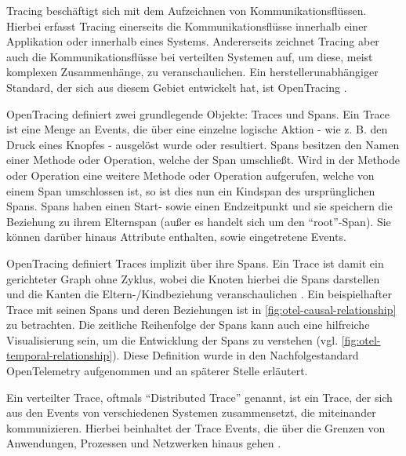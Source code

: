 Tracing beschäftigt sich mit dem Aufzeichnen von Kommunikationsflüssen. Hierbei erfasst Tracing einerseits die Kommunikationsflüsse innerhalb einer Applikation oder innerhalb eines Systems. Andererseits zeichnet Tracing aber auch die Kommunikationsflüsse bei verteilten Systemen auf, um diese, meist komplexen Zusammenhänge, zu veranschaulichen. Ein herstellerunabhängiger Standard, der sich aus diesem Gebiet entwickelt hat, ist OpenTracing \cite{OpenTracing}.

OpenTracing definiert zwei grundlegende Objekte: Traces und Spans. Ein Trace ist eine Menge an Events, die über eine einzelne logische Aktion - wie z. B. den Druck eines Knopfes - ausgelöst wurde oder resultiert. Spans besitzen den Namen einer Methode oder Operation, welche der Span umschließt. Wird in der Methode oder Operation eine weitere Methode oder Operation aufgerufen, welche von einem Span umschlossen ist, so ist dies nun ein Kindspan des ursprünglichen Spans. Spans haben einen Start- sowie einen Endzeitpunkt und sie speichern die Beziehung zu ihrem Elternspan (außer es handelt sich um den \enquote{root}-Span). Sie können darüber hinaus Attribute enthalten, sowie eingetretene Events.

OpenTracing definiert Traces implizit über ihre Spans. Ein Trace ist damit ein gerichteter Graph ohne Zyklus, wobei die Knoten hierbei die Spans darstellen und die Kanten die Eltern-/Kindbeziehung veranschaulichen \cite{OpenTracingSpecification}. Ein beispielhafter Trace mit seinen Spans und deren Beziehungen ist in \autoref{fig:otel-causal-relationship} zu betrachten. Die zeitliche Reihenfolge der Spans kann auch eine hilfreiche Visualisierung sein, um die Entwicklung der Spans zu verstehen \citationneeded (vgl. \autoref{fig:otel-temporal-relationship}). Diese Definition wurde in den Nachfolgestandard OpenTelemetry aufgenommen und an späterer Stelle erläutert.

Ein verteilter Trace, oftmals \enquote{Distributed Trace} genannt, ist ein Trace, der sich aus den Events von verschiedenen Systemen zusammensetzt, die miteinander kommunizieren. Hierbei beinhaltet der Trace Events, die über die Grenzen von Anwendungen, Prozessen und Netzwerken hinaus gehen \cite{OpenTracingSpecification}.

